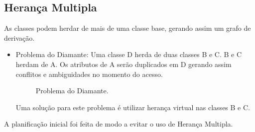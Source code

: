 \documentclass[rel_mlp]{iiufrgs}
\newcommand{\fonte}[1]{\\Fonte: {#1}}
\begin{document}
\subsection{Herança Multipla} 	
As classes podem herdar de mais de uma classe base, gerando assim um grafo de derivação.
 \begin{itemize}
   \item Problema do Diamante: Uma classe D herda de duas classes B e C. B e C herdam de A. Os atributos de A serão duplicados em D gerando   assim conflitos e ambiguidades no momento do acesso. 
\begin{figure}[htb]
    \centering
    \label{fig:figura3}
    \caption{Problema do Diamante.}
\end{figure}
   
   
   
   Uma solução para este problema  é utilizar herança virtual nas classes B e C.
 \end{itemize}  	
 A planificação inicial foi feita de modo a evitar o uso de Herança Multipla.

%

%

\end{document}
